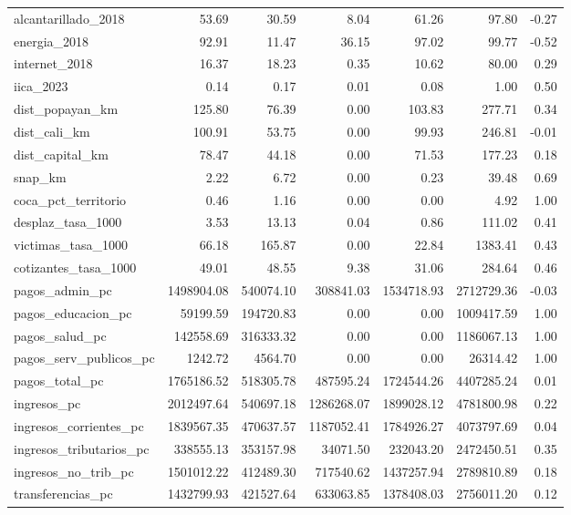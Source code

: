 \begin{longtable}[t]{lrrrrrr}
\addlinespace
alcantarillado\_2018 & 53.69 & 30.59 & 8.04 & 61.26 & 97.80 & -0.27\\
energia\_2018 & 92.91 & 11.47 & 36.15 & 97.02 & 99.77 & -0.52\\
internet\_2018 & 16.37 & 18.23 & 0.35 & 10.62 & 80.00 & 0.29\\
iica\_2023 & 0.14 & 0.17 & 0.01 & 0.08 & 1.00 & 0.50\\
dist\_popayan\_km & 125.80 & 76.39 & 0.00 & 103.83 & 277.71 & 0.34\\
\addlinespace
dist\_cali\_km & 100.91 & 53.75 & 0.00 & 99.93 & 246.81 & -0.01\\
dist\_capital\_km & 78.47 & 44.18 & 0.00 & 71.53 & 177.23 & 0.18\\
snap\_km & 2.22 & 6.72 & 0.00 & 0.23 & 39.48 & 0.69\\
coca\_pct\_territorio & 0.46 & 1.16 & 0.00 & 0.00 & 4.92 & 1.00\\
desplaz\_tasa\_1000 & 3.53 & 13.13 & 0.04 & 0.86 & 111.02 & 0.41\\
\addlinespace
victimas\_tasa\_1000 & 66.18 & 165.87 & 0.00 & 22.84 & 1383.41 & 0.43\\
cotizantes\_tasa\_1000 & 49.01 & 48.55 & 9.38 & 31.06 & 284.64 & 0.46\\
pagos\_admin\_pc & 1498904.08 & 540074.10 & 308841.03 & 1534718.93 & 2712729.36 & -0.03\\
pagos\_educacion\_pc & 59199.59 & 194720.83 & 0.00 & 0.00 & 1009417.59 & 1.00\\
pagos\_salud\_pc & 142558.69 & 316333.32 & 0.00 & 0.00 & 1186067.13 & 1.00\\
\addlinespace
pagos\_serv\_publicos\_pc & 1242.72 & 4564.70 & 0.00 & 0.00 & 26314.42 & 1.00\\
pagos\_total\_pc & 1765186.52 & 518305.78 & 487595.24 & 1724544.26 & 4407285.24 & 0.01\\
ingresos\_pc & 2012497.64 & 540697.18 & 1286268.07 & 1899028.12 & 4781800.98 & 0.22\\
ingresos\_corrientes\_pc & 1839567.35 & 470637.57 & 1187052.41 & 1784926.27 & 4073797.69 & 0.04\\
ingresos\_tributarios\_pc & 338555.13 & 353157.98 & 34071.50 & 232043.20 & 2472450.51 & 0.35\\
\addlinespace
ingresos\_no\_trib\_pc & 1501012.22 & 412489.30 & 717540.62 & 1437257.94 & 2789810.89 & 0.18\\
transferencias\_pc & 1432799.93 & 421527.64 & 633063.85 & 1378408.03 & 2756011.20 & 0.12\\

\end{longtable}
